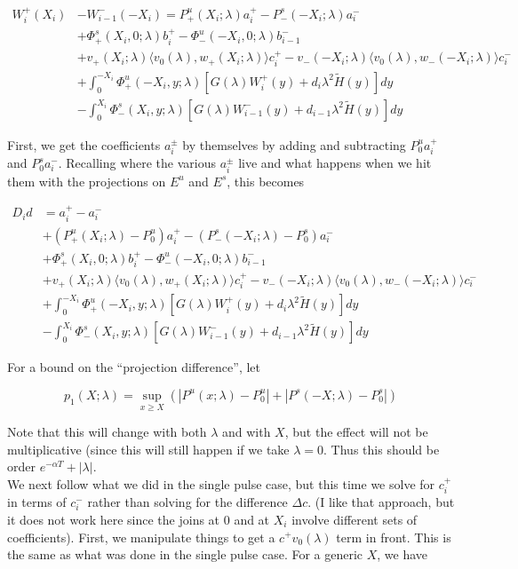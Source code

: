 \documentclass[12pt]{article}
\begin{document}
\begin{enumerate}
\begin{align*}
W_i^+(X_i) &- W_{i-1}^-(-X_i) = P^u_+(X_i; \lambda) a_i^+ - P^s_-(-X_i; \lambda) a_i^- \\
&+ \Phi^s_+(X_i, 0; \lambda)b_i^+ - \Phi^u_-(-X_i, 0; \lambda)b_{i-1}^- \\
&+ v_+(X_i; \lambda) \langle v_0(\lambda), w_+(X_i; \lambda) \rangle c_i^+ - v_-(-X_i; \lambda) \langle v_0(\lambda), w_-(-X_i; \lambda) \rangle c_i^- \\
&+ \int_0^{-X_i} \Phi^u_+(-X_i, y; \lambda) [ G(\lambda)W_i^+(y) + d_i \lambda^2 \tilde{H}(y) ] dy \\
&- \int_0^{X_i} \Phi^s_-(X_i, y; \lambda) [ G(\lambda)W_{i-1}^-(y) + d_{i-1} \lambda^2 \tilde{H}(y) ] dy
\end{align*}

First, we get the coefficients $a_i^\pm$ by themselves by adding and subtracting $P_0^u a_i^+$ and $P_0^s a_i^-$. Recalling where the various $a_i^\pm$ live and what happens when we hit them with the projections on $E^u$ and $E^s$, this becomes

\begin{align*}
D_i d &= a_i^+ - a_i^- \\
&+ (P^u_+(X_i; \lambda) - P_0^u)a_i^+ - (P^s_-(-X_i; \lambda) - P_0^s)a_i^- \\
&+ \Phi^s_+(X_i, 0; \lambda)b_i^+ - \Phi^u_-(-X_i, 0; \lambda)b_{i-1}^- \\
&+ v_+(X_i; \lambda) \langle v_0(\lambda), w_+(X_i; \lambda) \rangle c_i^+ - v_-(-X_i; \lambda) \langle v_0(\lambda), w_-(-X_i; \lambda) \rangle c_i^- \\
&+ \int_0^{-X_i} \Phi^u_+(-X_i, y; \lambda) [ G(\lambda)W_i^+(y) + d_i \lambda^2 \tilde{H}(y) ] dy \\
&- \int_0^{X_i} \Phi^s_-(X_i, y; \lambda) [ G(\lambda)W_{i-1}^-(y) + d_{i-1} \lambda^2 \tilde{H}(y) ] dy
\end{align*}

For a bound on the ``projection difference'', let

\[
p_1(X;\lambda) = \sup_{x \geq X} (|P^u(x;\lambda) - P_0^u| + |P^s(-X;\lambda) - P_0^s|)
\]

Note that this will change with both $\lambda$ and with $X$, but the effect will not be multiplicative (since this will still happen if we take $\lambda = 0$. Thus this should be order $e^{-\alpha T} + |\lambda|$. \\

We next follow what we did in the single pulse case, but this time we solve for $c_i^+$ in terms of $c_i^-$ rather than solving for the difference $\Delta c$. (I like that approach, but it does not work here since the joins at 0 and at $X_i$ involve different sets of coefficients). First, we manipulate things to get a $c^+ v_0(\lambda)$ term in front. This is the same as what was done in the single pulse case. For a generic $X$, we have


\end{enumerate}
\end{document}
